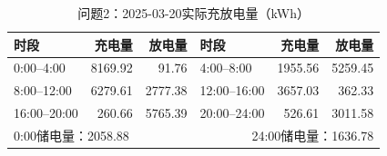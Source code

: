 \begin{table}[H]\centering\small
\caption{问题2：2025-03-20实际充放电量（kWh）}
\label{tab:q2_0320_storage}
\begin{tabular}{lrrlrr}\toprule
时段 & 充电量 & 放电量 & 时段 & 充电量 & 放电量\\\midrule
0:00--4:00 & 8169.92 & 91.76 & 4:00--8:00 & 1955.56 & 5259.45 \\
8:00--12:00 & 6279.61 & 2777.38 & 12:00--16:00 & 3657.03 & 362.33 \\
16:00--20:00 & 260.66 & 5765.39 & 20:00--24:00 & 526.61 & 3011.58 \\
\midrule\multicolumn{3}{l}{0:00储电量：2058.88} & \multicolumn{3}{r}{24:00储电量：1636.78}\\
\bottomrule\end{tabular}\end{table}
